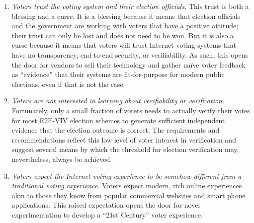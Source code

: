 \begin{enumerate}
\item \emph{Voters trust the voting system and their election
    officials.} This trust is both a blessing and a curse. It is a
  blessing because it means that election officials and the government
  are working with voters that have a positive attitude; their trust
  can only be lost and does not need to be won. But it is also a curse
  because it means that voters will trust Internet voting systems that
  have no transparency, end-to-end security, or verifiability. As
  such, this opens the door for vendors to sell their technology and
  gather na\"{i}ve voter feedback as ``evidence'' that their systems are
  fit-for-purpose for modern public elections, even if that is not the
  case.

\item \emph{Voters are not interested in learning about verifiability
    or verification.} Fortunately, only a small fraction of voters
  needs to actually verify their votes for most E2E-VIV election
  schemes to generate sufficient independent evidence that the
  election outcome is correct. The requirements and recommendations
  reflect this low level of voter interest in verification and suggest
  several means by which the threshold for election verification may,
  nevertheless, always be achieved.  

\item \emph{Voters expect the Internet voting experience to be somehow
    different from a traditional voting experience.} Voters expect
  modern, rich online experiences akin to those they know from popular
  commercial websites and smart phone applications. This raised
  expectation opens the door for novel experimentation to develop a
  ``21st Century'' voter experience.
\end{enumerate}

